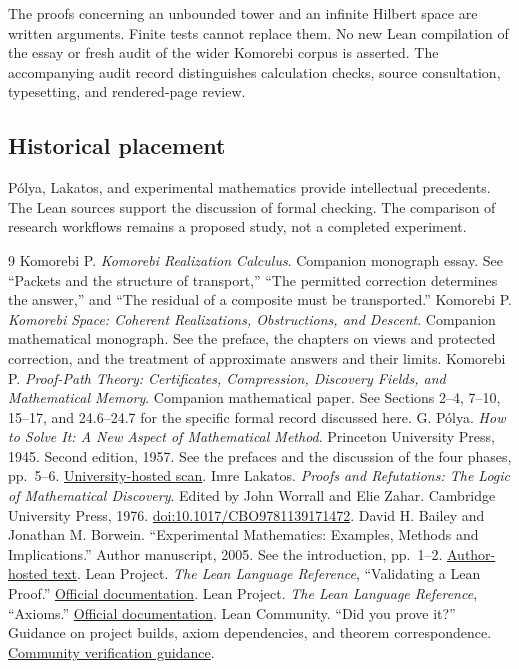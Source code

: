 The proofs concerning an unbounded tower and an infinite Hilbert space are written arguments. Finite tests cannot replace them. No new Lean compilation of the essay or fresh audit of the wider Komorebi corpus is asserted. The accompanying audit record distinguishes calculation checks, source consultation, typesetting, and rendered-page review.

\subsection*{Historical placement}
P\'olya, Lakatos, and experimental mathematics provide intellectual precedents. The Lean sources support the discussion of formal checking. The comparison of research workflows remains a proposed study, not a completed experiment.

\clearpage
{}
{}
\renewcommand{\refname}{References}
\begin{thebibliography}{9}
\setlength{\itemsep}{8pt}
 Komorebi P. \emph{Komorebi Realization Calculus}. Companion monograph essay. See ``Packets and the structure of transport,'' ``The permitted correction determines the answer,'' and ``The residual of a composite must be transported.''
 Komorebi P. \emph{Komorebi Space: Coherent Realizations, Obstructions, and Descent}. Companion mathematical monograph. See the preface, the chapters on views and protected correction, and the treatment of approximate answers and their limits.
 Komorebi P. \emph{Proof-Path Theory: Certificates, Compression, Discovery Fields, and Mathematical Memory}. Companion mathematical paper. See Sections 2--4, 7--10, 15--17, and 24.6--24.7 for the specific formal record discussed here.
 G. P\'olya. \emph{How to Solve It: A New Aspect of Mathematical Method}. Princeton University Press, 1945. Second edition, 1957. See the prefaces and the discussion of the four phases, pp.~5--6. \href{https://sites.math.rutgers.edu/~zeilberg/math436/polya.pdf}{University-hosted scan}.
 Imre Lakatos. \emph{Proofs and Refutations: The Logic of Mathematical Discovery}. Edited by John Worrall and Elie Zahar. Cambridge University Press, 1976. \href{https://www.cambridge.org/core/books/proofs-and-refutations/575FC8A6B4FAB79E649EDF5FBB9C6E10}{doi:10.1017/CBO9781139171472}.
 David H. Bailey and Jonathan M. Borwein. ``Experimental Mathematics: Examples, Methods and Implications.'' Author manuscript, 2005. See the introduction, pp.~1--2. \href{https://www.davidhbailey.com/dhbpapers/ams-expmath.pdf}{Author-hosted text}.
 Lean Project. \emph{The Lean Language Reference}, ``Validating a Lean Proof.'' \href{https://lean-lang.org/doc/reference/latest/ValidatingProofs/}{Official documentation}.
 Lean Project. \emph{The Lean Language Reference}, ``Axioms.'' \href{https://lean-lang.org/doc/reference/latest/Axioms/}{Official documentation}.
 Lean Community. ``Did you prove it?'' Guidance on project builds, axiom dependencies, and theorem correspondence. \href{https://leanprover-community.github.io/did_you_prove_it.html}{Community verification guidance}.
\end{thebibliography}
